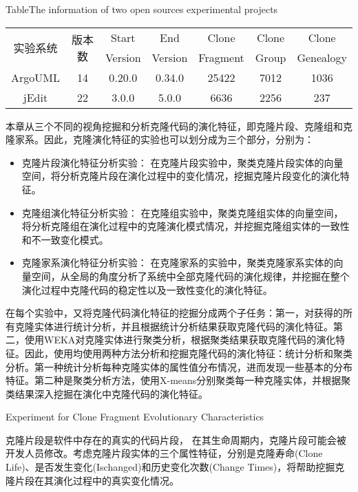 \begin{table}[htbp]
{Table$\!$}{The information of two open sources experimental projects }
\vspace{0.5em}
\centering 
\wuhao
\begin{tabular}{ccccccc}
\toprule[1.5pt ]
\multirow{2}{*}{实验系统}&\multirow{2}{*}{版本数}&Start&End&Clone&Clone&Clone\\ 
&&Version&Version&Fragment&Group&Genealogy\\
\midrule[1pt]
ArgoUML&14&0.20.0&0.34.0&25422&7012&1036\\ 
jEdit&22&3.0.0&5.0.0&6636&2256	&237\\ 
\bottomrule[1.5pt]
\end{tabular}
\end{table}

本章从三个不同的视角挖掘和分析克隆代码的演化特征，即克隆片段、克隆组和克隆家系。因此，克隆演化特征的实验也可以划分成为三个部分，分别为：
\begin{itemize}
\item 克隆片段演化特征分析实验：
在克隆片段实验中，聚类克隆片段实体的向量空间，将分析克隆片段在演化过程中的变化情况，挖掘克隆片段变化的演化特征。 
\item 克隆组演化特征分析实验：
在克隆组实验中，聚类克隆组实体的向量空间，将分析克隆组在演化过程中的克隆演化模式情况，并挖掘克隆组实体的一致性和不一致变化模式。
\item 克隆家系演化特征分析实验：
在克隆家系的实验中，聚类克隆家系实体的向量空间，从全局的角度分析了系统中全部克隆代码的演化规律，并挖掘在整个演化过程中克隆代码的稳定性以及一致性变化的演化特征。
\end{itemize}

在每个实验中，又将克隆代码演化特征的挖掘分成两个子任务：第一，对获得的所有克隆实体进行统计分析，并且根据统计分析结果获取克隆代码的演化特征。第二，使用WEKA对克隆实体进行聚类分析，根据聚类结果获取克隆代码的演化特征。因此，使用均使用两种方法分析和挖掘克隆代码的演化特征：统计分析和聚类分析。第一种统计分析每种克隆实体的属性值分布情况，进而发现一些基本的分布特征。第二种是聚类分析方法，使用X-means分别聚类每一种克隆实体，并根据聚类结果深入挖掘在演化中克隆代码的演化特征。

{Experiment for Clone Fragment Evolutionary Characteristics}

克隆片段是软件中存在的真实的代码片段， 在其生命周期内，克隆片段可能会被开发人员修改。考虑克隆片段实体的三个属性特征，分别是克隆寿命(Clone Life)、是否发生变化(Ischanged)和历史变化次数(Change Times)，将帮助挖掘克隆片段在其演化过程中的真实变化情况。


